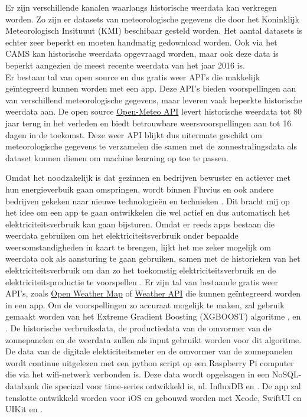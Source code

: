 Er zijn verschillende kanalen waarlangs historische weerdata kan verkregen worden. Zo zijn er datasets van meteorologische gegevens die door het Koninklijk Meteorologisch Insituuut (KMI) beschibaar gesteld worden. Het aantal datasets is echter zeer beperkt en moeten handmatig gedownload worden. Ook via het CAMS kan historische weerdata opgevraagd worden, maar ook deze data is beperkt aangezien de meest recente weerdata van het jaar 2016 is. \\

Er bestaan tal van open source en dus gratis weer API's die makkelijk geïntegreerd kunnen worden met een app. Deze API's bieden voorspellingen aan van verschillend meteorologische gegevens, maar leveren vaak beperkte historische weerdata aan. 
De open source \href{https://open-meteo.com/}{Open-Meteo API} levert historische weerdata tot 80 jaar terug in het verleden en biedt betrouwbare weersvoorspellingen aan tot 16 dagen in de toekomst. Deze weer API blijkt dus uitermate geschikt om meteorologische gegevens te verzamelen die samen met de zonnestralingsdata als dataset kunnen dienen om machine learning op toe te passen.


\bigskip
\bigskip
\bigskip
\bigskip
\bigskip
\bigskip
\bigskip
\bigskip
\bigskip
\bigskip
\bigskip
\bigskip
\bigskip
\bigskip
\bigskip
\bigskip
\bigskip
\bigskip
\bigskip
\bigskip
\bigskip
\bigskip
\bigskip
\bigskip
\bigskip
\bigskip
\bigskip
\bigskip
\bigskip
\bigskip


Omdat het noodzakelijk is dat gezinnen en bedrijven bewuster en actiever met hun energieverbuik gaan omspringen, wordt binnen Fluvius en ook andere bedrijven gekeken naar nieuwe technologieën en technieken \autocite{Verdoodt2018}. Dit bracht mij op het idee om een app te gaan ontwikkelen die wel actief en dus automatisch het elektriciteitsverbruik kan gaan bijsturen. Omdat er reeds apps bestaan die weerdata gebruiken om het elektriciteitsverbruik onder bepaalde weersomstandigheden in kaart te brengen, lijkt het me zeker mogelijk om weerdata ook als aansturing te gaan gebruiken, samen met de historieken van het elektriciteitsverbruik om dan zo het toekomstig elektriciteitsverbruik en de elektriciteitsproductie te voorspellen \autocite{Guo2022}. Er zijn tal van bestaande gratis weer API's, zoals \href{https://openweathermap.org/api}{Open Weather Map} of \href{https://www.weatherapi.com/}{Weather API} die kunnen geïntegreerd worden in een app. Om de voorspellingen zo accuraat mogelijk te maken, zal gebruik gemaakt worden van het Extreme Gradient Boosting (XGBOOST) algoritme \autocite{Ledmaoui2023}, \autocite{Wang2022} en \autocite{BarreraAnimas2022}. De historische verbruiksdata, de productiedata van de omvormer van de zonnepanelen en de weerdata zullen als input gebruikt worden voor dit algoritme. De data van de digitale elekticiteitsmeter en de omvormer van de zonnepanelen wordt continue uitgelezen met een python script op een Raspberry Pi computer die via het wifi-netwerk verbonden is. Deze data wordt opgelsagen in een NoSQL-databank die speciaal voor time-series ontwikkeld is, nl. InfluxDB \autocite{Balis2017} en  \autocite{Struckov2019}. De app zal tenslotte ontwikkeld worden voor iOS en gebouwd worden met Xcode, SwiftUI en UIKit \autocite{Allardice} en \autocite{Firtman2022}.

